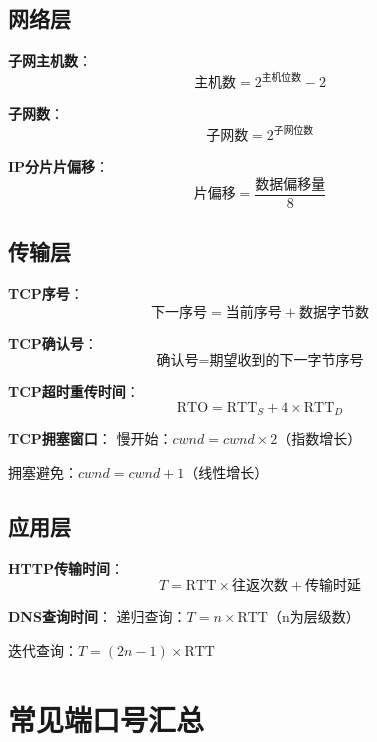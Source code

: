 \subsection{网络层}

\begin{formulabox}
\textbf{子网主机数}：
$$\text{主机数} = 2^{\text{主机位数}} - 2$$

\textbf{子网数}：
$$\text{子网数} = 2^{\text{子网位数}}$$

\textbf{IP分片片偏移}：
$$\text{片偏移} = \frac{\text{数据偏移量}}{8}$$
\end{formulabox}

\subsection{传输层}

\begin{formulabox}
\textbf{TCP序号}：
$$\text{下一序号} = \text{当前序号} + \text{数据字节数}$$

\textbf{TCP确认号}：
$$\text{确认号} = \text{期望收到的下一字节序号}$$

\textbf{TCP超时重传时间}：
$$\text{RTO} = \text{RTT}_S + 4 \times \text{RTT}_D$$

\textbf{TCP拥塞窗口}：
慢开始：$cwnd = cwnd \times 2$（指数增长）

拥塞避免：$cwnd = cwnd + 1$（线性增长）
\end{formulabox}

\subsection{应用层}

\begin{formulabox}
\textbf{HTTP传输时间}：
$$T = \text{RTT} \times \text{往返次数} + \text{传输时延}$$

\textbf{DNS查询时间}：
递归查询：$T = n \times \text{RTT}$（n为层级数）

迭代查询：$T = (2n-1) \times \text{RTT}$
\end{formulabox}

\section{常见端口号汇总}

